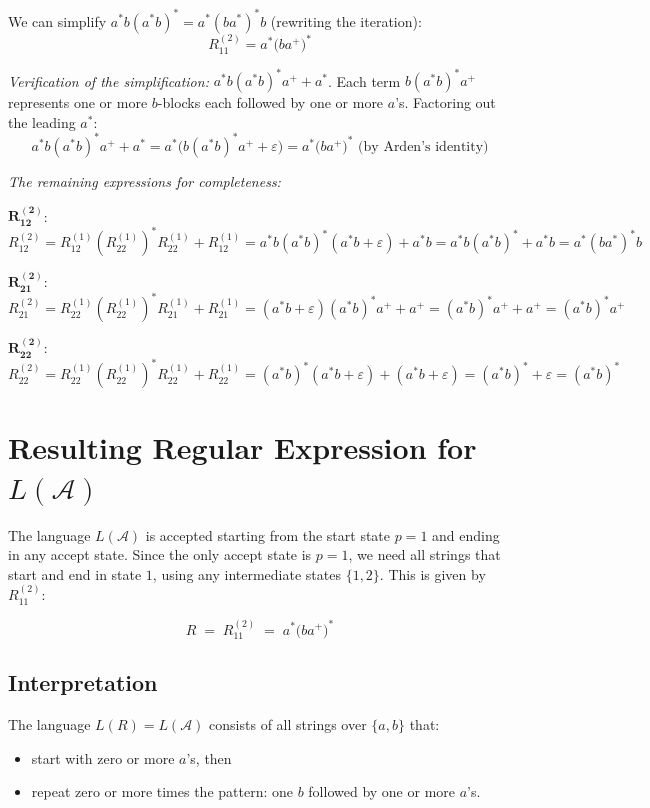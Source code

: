 \documentclass{article}
\theoremstyle{theorem}
\theoremstyle{definition}
\theoremstyle{remark}
\begin{document}
We can simplify $a^*b(a^*b)^*= a^*(ba^*)^*b$ (rewriting the iteration):
\[
\boxed{R^{(2)}_{11} = a^*\bigl(ba^+\bigr)^*}
\]

\textit{Verification of the simplification:} $a^*b(a^*b)^*a^+ + a^*$. Each term $b(a^*b)^*a^+$ represents one or more $b$-blocks each followed by one or more $a$'s. Factoring out the leading $a^*$:
\[
a^*b(a^*b)^* a^+ + a^* = a^*\bigl(b(a^*b)^* a^+ + \varepsilon\bigr) = a^*\bigl(ba^+)^* \text{ (by Arden's identity)}
\]

\medskip
\noindent\textit{The remaining expressions for completeness:}

\medskip
\noindent$\boldsymbol{R^{(2)}_{12}}$:
\[
R^{(2)}_{12} = R^{(1)}_{12}(R^{(1)}_{22})^* R^{(1)}_{22} + R^{(1)}_{12}
= a^*b(a^*b)^*(a^*b+\varepsilon) + a^*b
= a^*b(a^*b)^* + a^*b = a^*(ba^*)^*b
\]

\medskip
\noindent$\boldsymbol{R^{(2)}_{21}}$:
\[
R^{(2)}_{21} = R^{(1)}_{22}(R^{(1)}_{22})^* R^{(1)}_{21} + R^{(1)}_{21}
= (a^*b+\varepsilon)(a^*b)^* a^+ + a^+
= (a^*b)^* a^+ + a^+ = (a^*b)^* a^+
\]

\medskip
\noindent$\boldsymbol{R^{(2)}_{22}}$:
\[
R^{(2)}_{22} = R^{(1)}_{22}(R^{(1)}_{22})^* R^{(1)}_{22} + R^{(1)}_{22}
= (a^*b)^*(a^*b+\varepsilon) + (a^*b+\varepsilon)
= (a^*b)^* + \varepsilon = (a^*b)^*
\]

\section*{Resulting Regular Expression for $L(\mathcal{A})$}

The language $L(\mathcal{A})$ is accepted starting from the start state $p = 1$ and ending in any accept state. Since the only accept state is $p = 1$, we need all strings that start and end in state $1$, using any intermediate states $\{1,2\}$. This is given by $R^{(2)}_{11}$:

\[
\boxed{R \;=\; R^{(2)}_{11} \;=\; a^*\bigl(ba^+\bigr)^*}
\]

\subsection*{Interpretation}

The language $L(R) = L(\mathcal{A})$ consists of all strings over $\{a, b\}$ that:
\begin{itemize}
    \item start with zero or more $a$'s, then
    \item repeat zero or more times the pattern: one $b$ followed by one or more $a$'s.
\end{itemize}
\end{document}
